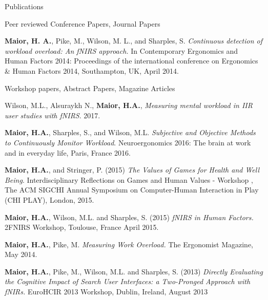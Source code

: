 \documentclass{resume} %
\begin{document}
\begin{rSection}{Publications}
\begin{rSubsection}{ }{ }{ }{Peer reviewed Conference Papers, Journal Papers}
			\item \textbf{Maior, H. A.}, Pike, M., Wilson, M. L., and Sharples, S. \emph{Continuous detection of workload overload: An fNIRS approach.} In Contemporary Ergonomics and Human Factors 2014: Proceedings of the international conference on Ergonomics \& Human Factors 2014, Southampton, UK, April 2014.
		\end{rSubsection}
		
		\begin{rSubsection}{ }{ }{ }{Workshop papers, Abstract Papers, Magazine Articles}
			
			\item Wilson, M.L., Alsuraykh N., \textbf{Maior, H.A.},  \emph{Measuring mental workload in IIR user studies with fNIRS}. 2017.
			\item \textbf{Maior, H.A.}, Sharples, S., and Wilson, M.L. \emph{Subjective and Objective Methods to Continuously Monitor Workload}. Neuroergonomics 2016: The brain at work and in everyday life, Paris, France 2016.
			\item \textbf{Maior, H.A.}, and Stringer, P. (2015) \emph{The Values of Games for Health and Well Being}. Interdisciplinary Reflections on Games and Human Values - Workshop , The ACM SIGCHI Annual Symposium on Computer-Human Interaction in Play (CHI PLAY), London, 2015.
			\item \textbf{Maior, H.A.}, Wilson, M.L. and Sharples, S. (2015) \emph{fNIRS in Human Factors.} 2FNIRS Workshop, Toulouse, France April 2015.
			\item \textbf{Maior, H.A.}, Pike, M. \emph{Measuring Work Overload.} The Ergonomist Magazine, May 2014.
			\item \textbf{Maior, H.A.}, Pike, M., Wilson, M.L. and Sharples, S. (2013) \emph{Directly Evaluating the Cognitive Impact of Search User Interfaces: a Two-Pronged Approach with fNIRs.} EuroHCIR 2013 Workshop, Dublin, Ireland, August 2013
		\end{rSubsection}
		
	\end{rSection}
	\newpage
\end{document}
